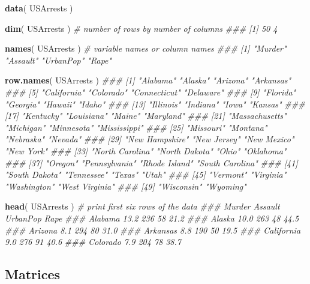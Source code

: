 \documentclass[]{book}
\newenvironment{Shaded}{\begin{snugshade}}{\end{snugshade}}
\newcommand{\CommentTok}[1]{\textcolor[rgb]{0.56,0.35,0.01}{\textit{#1}}}
\newcommand{\KeywordTok}[1]{\textcolor[rgb]{0.13,0.29,0.53}{\textbf{#1}}}
\newcommand{\NormalTok}[1]{#1}
\theoremstyle{definition}
\theoremstyle{definition}
\theoremstyle{definition}
\theoremstyle{remark}
\begin{document}
\begin{Shaded}
\begin{Highlighting}[]

\KeywordTok{data}\NormalTok{( USArrests )}

\KeywordTok{dim}\NormalTok{( USArrests )   }\CommentTok{# number of rows by number of columns}
\CommentTok{### [1] 50  4}

\KeywordTok{names}\NormalTok{( USArrests )   }\CommentTok{# variable names or column names}
\CommentTok{### [1] "Murder"   "Assault"  "UrbanPop" "Rape"}

\KeywordTok{row.names}\NormalTok{( USArrests )}
\CommentTok{###  [1] "Alabama"        "Alaska"         "Arizona"        "Arkansas"      }
\CommentTok{###  [5] "California"     "Colorado"       "Connecticut"    "Delaware"      }
\CommentTok{###  [9] "Florida"        "Georgia"        "Hawaii"         "Idaho"         }
\CommentTok{### [13] "Illinois"       "Indiana"        "Iowa"           "Kansas"        }
\CommentTok{### [17] "Kentucky"       "Louisiana"      "Maine"          "Maryland"      }
\CommentTok{### [21] "Massachusetts"  "Michigan"       "Minnesota"      "Mississippi"   }
\CommentTok{### [25] "Missouri"       "Montana"        "Nebraska"       "Nevada"        }
\CommentTok{### [29] "New Hampshire"  "New Jersey"     "New Mexico"     "New York"      }
\CommentTok{### [33] "North Carolina" "North Dakota"   "Ohio"           "Oklahoma"      }
\CommentTok{### [37] "Oregon"         "Pennsylvania"   "Rhode Island"   "South Carolina"}
\CommentTok{### [41] "South Dakota"   "Tennessee"      "Texas"          "Utah"          }
\CommentTok{### [45] "Vermont"        "Virginia"       "Washington"     "West Virginia" }
\CommentTok{### [49] "Wisconsin"      "Wyoming"}

\KeywordTok{head}\NormalTok{( USArrests )  }\CommentTok{# print first six rows of the data}
\CommentTok{###            Murder Assault UrbanPop Rape}
\CommentTok{### Alabama      13.2     236       58 21.2}
\CommentTok{### Alaska       10.0     263       48 44.5}
\CommentTok{### Arizona       8.1     294       80 31.0}
\CommentTok{### Arkansas      8.8     190       50 19.5}
\CommentTok{### California    9.0     276       91 40.6}
\CommentTok{### Colorado      7.9     204       78 38.7}
\end{Highlighting}
\end{Shaded}

\hypertarget{matrices}{%
\subsection{Matrices}\label{matrices}}
\end{document}
